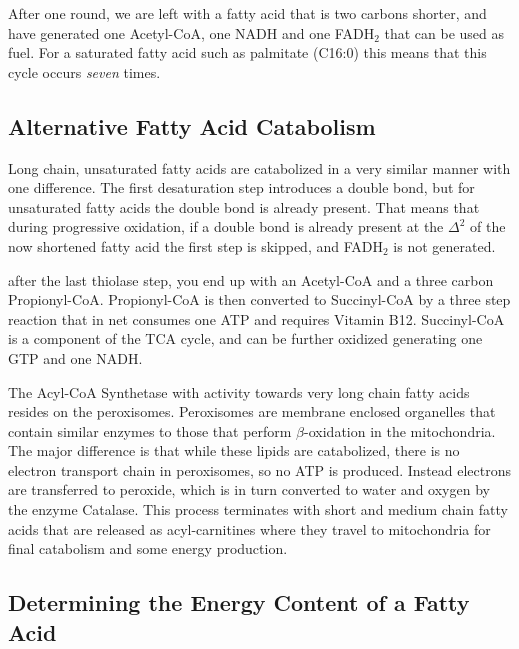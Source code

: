 \documentclass{tufte-handout}
\begin{document}
After one round, we are left with a fatty acid that is two carbons shorter, and have generated one Acetyl-CoA, one NADH and one FADH$_2$ that can be used as fuel.  For a saturated fatty acid such as palmitate (C16:0) this means that this cycle occurs \emph{seven} times.

\subsection{Alternative Fatty Acid Catabolism}

Long chain, unsaturated fatty acids are catabolized in a very similar manner with one difference.  The first desaturation step introduces a double bond, but for unsaturated fatty acids the double bond is already present.  That means that during progressive oxidation, if a double bond is already present at the $\Delta^2$ of the now shortened fatty acid the first step is skipped, and FADH$_2$ is not generated.

 after the last thiolase step, you end up with an Acetyl-CoA and a three carbon Propionyl-CoA.  Propionyl-CoA is then converted to Succinyl-CoA by a three step reaction that in net consumes one ATP and requires Vitamin B12.  Succinyl-CoA is a component of the TCA cycle, and can be further oxidized generating one GTP and one NADH.  

  The Acyl-CoA Synthetase with activity towards very long chain fatty acids resides on the peroxisomes.  Peroxisomes are membrane enclosed organelles that contain similar enzymes to those that perform $\beta$-oxidation in the mitochondria.  The major difference is that while these lipids are catabolized, there is no electron transport chain in peroxisomes, so no ATP is produced.  Instead electrons are transferred to peroxide, which is in turn converted to water and oxygen by the enzyme Catalase.  This process terminates with short and medium chain fatty acids that are released as acyl-carnitines where they travel to mitochondria for final catabolism and some energy production.

\subsection{Determining the Energy Content of a Fatty Acid}
\end{document}

